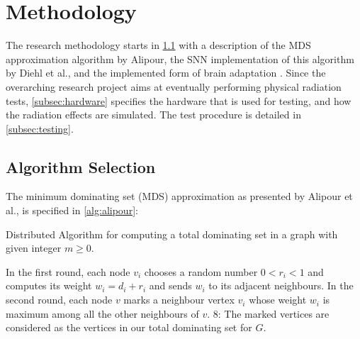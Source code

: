\section{Methodology}\label{sec:methodology}
The research methodology starts in \cref{subsec:algorithm} with a description of the MDS approximation algorithm by Alipour, the SNN implementation of this algorithm by Diehl et al., and the implemented form%
of brain adaptation \cite{alipour}\cite{diehl}. Since the overarching research project aims at eventually performing physical radiation tests, \cref{subsec:hardware} specifies the hardware that is used for testing, and how the radiation effects are simulated. The test procedure is detailed in \cref{subsec:testing}.

\subsection{Algorithm Selection}\label{subsec:algorithm}
The minimum dominating set (MDS) approximation as presented by Alipour et al., is specified in \cref{alg:alipour}:
\begin{algorithm}%
    \caption{Distributed Algorithm for computing a total dominating set in a graph with given integer $m\geq 0$.}\label{alg:alipour}
    In the first round, each node $v_i$ chooses a random number $0<r_i<1$ and computes its weight $w_i=d_i+r_i$ and sends $w_i$ to its
    adjacent neighbours.\;
    In the second round, each node $v$ marks a neighbour vertex $v_i$ whose weight $w_i$ is maximum among all the other neighbours of $v$.\;
    8: The marked vertices are considered as the vertices in our total dominating set for $G$.\;
\end{algorithm}

